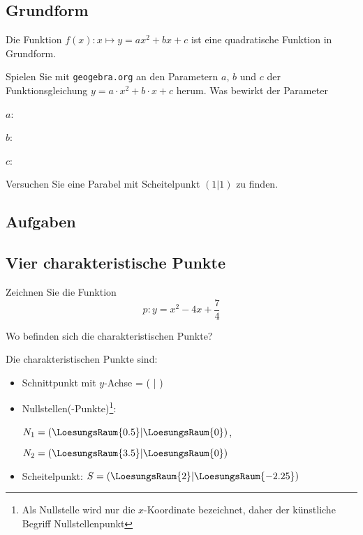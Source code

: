 \newpage

\subsection{Grundform}
Die Funktion $f(x): x \mapsto y = ax^2 + bx +c$ ist eine
quadratische Funktion in Grundform.

Spielen Sie mit  \texttt{geogebra.org} an den Parametern $a$, $b$ und $c$ der Funktionsgleichung $y = a\cdot{}x^2 + b\cdot{} x + c$ herum. Was bewirkt der Parameter

$a$: 

$b$: 

$c$: 

Versuchen Sie eine Parabel mit Scheitelpunkt $(1|1)$ zu finden.

\subsection*{Aufgaben}
\newpage

\subsection{Vier charakteristische Punkte}
Zeichnen Sie die Funktion
$$p: y = x^2 - 4x + \frac{7}{4}$$


Wo befinden sich die charakteristischen Punkte?



Die charakteristischen Punkte sind:
\begin{itemize}
\item Schnittpunkt mit $y$-Achse = ( | )
\item Nullstellen(-Punkte)\footnote{Als Nullstelle wird nur die
  $x$-Koordinate bezeichnet, daher der künstliche Begriff
  Nullstellenpunkt}: 

  $N_1=(\LoesungsRaum{0.5}| \LoesungsRaum{0})$,

  $N_2=( \LoesungsRaum{3.5}|\LoesungsRaum{0})$
  
\item Scheitelpunkt: $S=(\LoesungsRaum{2}|\LoesungsRaum{-2.25})$
\end{itemize}
 
